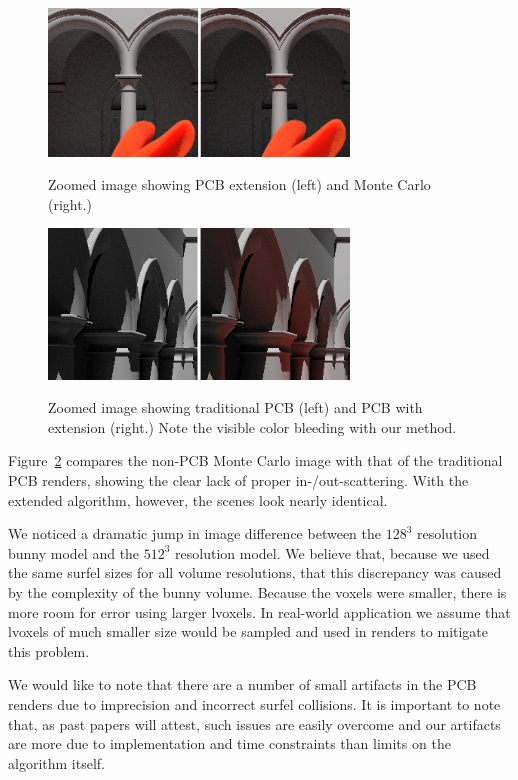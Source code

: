 \documentclass[12pt]{ucthesis}
\newcommand{\captionfonts}{\small\bf\ssp}
\begin{document}
\begin{figure}[h!]
    \centering
    \includegraphics[width=80mm]{img/compare1_corrected.png}
    \captionfonts
    \caption{Zoomed image showing PCB extension (left) and Monte Carlo (right.)}
    \label{fig:compare_close}
\end{figure}

\begin{figure}[h!]
    \centering
    \includegraphics[width=80mm]{img/compare_trad_corrected.png}
    \captionfonts
    \caption{Zoomed image showing traditional PCB (left) and PCB with extension (right.)  Note the visible color bleeding with our method.}
    \label{fig:compare_trad}
\end{figure}

Figure~\ref{fig:compare_trad} compares the non-PCB Monte Carlo image with that of the traditional PCB renders, showing the clear lack of proper in-/out-scattering.  With the extended algorithm, however, the scenes look nearly identical.

We noticed a dramatic jump in image difference between the $128^3$ resolution bunny model and the $512^3$ resolution model.  We believe that, because we used the same surfel sizes for all volume resolutions, that this discrepancy was caused by the complexity of the bunny volume.  Because the voxels were smaller, there is more room for error using larger lvoxels.  In real-world application we assume that lvoxels of much smaller size would be sampled and used in renders to mitigate this problem.

We would like to note that there are a number of small artifacts in the PCB renders due to imprecision and incorrect surfel collisions.  It is important to note that, as past papers will attest, such issues are easily overcome and our artifacts are more due to implementation and time constraints than limits on the algorithm itself.
\end{document}
